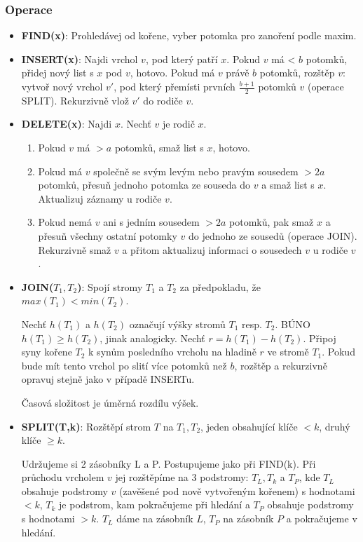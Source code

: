\documentclass[11pt]{report} %
\numberwithin{equation}{section}
\begin{document}
\subsubsection{Operace}
\begin{itemize}
	
	
	\item \textbf{FIND(x)}:
	Prohledávej od kořene, vyber potomka pro zanoření podle maxim.
	
	\item \textbf{INSERT(x)}:
	Najdi vrchol $v$, pod který patří $x$. Pokud $v$ má < $b$ potomků, přidej nový list s $x$ pod $v$, hotovo. Pokud má $v$ právě $b$ potomků, rozštěp $v$: vytvoř nový vrchol $v'$, pod který přemísti prvních $\frac{b+1}{2}$ potomků $v$ (operace SPLIT). Rekurzivně vlož $v'$ do rodiče $v$.

	\item \textbf{DELETE(x)}:
	Najdi $x$. Nechť $v$ je rodič $x$. 
	\begin{enumerate}
	
	
	\item Pokud $v$ má $> a$ potomků, smaž list s $x$, hotovo. 
	\item Pokud má $v$ společně se svým levým nebo pravým sousedem $> 2a$ potomků, přesuň jednoho potomka ze souseda do $v$ a smaž list s $x$. Aktualizuj záznamy u rodiče $v$.
	\item Pokud nemá $v$ ani s jedním sousedem $> 2a$ potomků, pak smaž $x$ a přesuň všechny ostatní potomky $v$ do jednoho ze sousedů (operace JOIN). Rekurzivně smaž $v$ a přitom aktualizuj informaci o sousedech $v$ u rodiče $v$.
	\end{enumerate}	

	\item \textbf{JOIN($T_1, T_2$)}:
	Spojí stromy $T_1$ a $T_2$ za předpokladu, že $max(T_1) < min(T_2)$.

	Nechť $h(T_1)$ a $h(T_2)$ označují výšky stromů $T_1$ resp. $T_2$. BÚNO $h(T_1) \geq h(T_2)$, jinak analogicky. Nechť $r = h(T_1) - h(T_2)$. Připoj syny kořene $T_2$ k synům posledního vrcholu na hladině $r$ ve stromě $T_1$. Pokud bude mít tento vrchol po slití více potomků než $b$, rozštěp a rekurzivně opravuj stejně jako v případě INSERTu.
	
	Časová složitost je úměrná rozdílu výšek.

	\item \textbf{SPLIT(T,k)}:
	Rozštěpí strom $T$ na $T_1, T_2$, jeden obsahující klíče $< k$, druhý klíče $\geq k$.
	
	Udržujeme si 2 zásobníky L a P. Postupujeme jako při FIND(k). Při průchodu vrcholem $v$ jej rozštěpíme na 3 podstromy: $T_L, T_k$ a $T_P$, kde $T_L$ obsahuje podstromy $v$ (zavěšené pod nově vytvořeným kořenem) s hodnotami $< k$, $T_k$ je podstrom, kam pokračujeme při hledání a $T_P$ obsahuje podstromy s hodnotami $> k$. $T_L$ dáme na zásobník $L$, $T_P$ na zásobník $P$ a pokračujeme v hledání.
	

\end{itemize}
\end{document}
